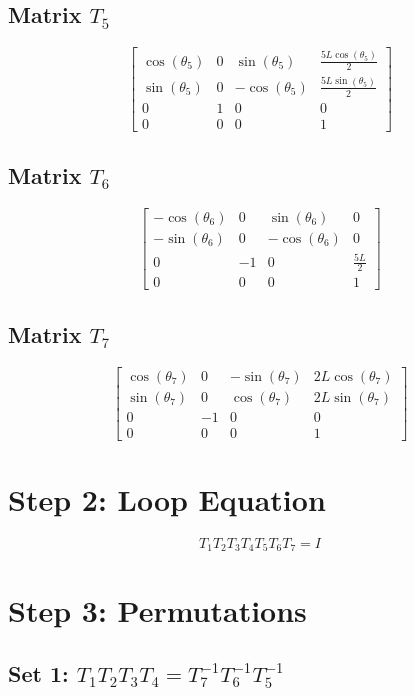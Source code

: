 \documentclass[12pt, a4paper]{article}
\begin{document}
\subsection*{Matrix $T_{5}$}
\[ \left[\begin{matrix}\cos{\left(\theta_{5} \right)} & 0 & \sin{\left(\theta_{5} \right)} & \frac{5 L \cos{\left(\theta_{5} \right)}}{2}\\\sin{\left(\theta_{5} \right)} & 0 & - \cos{\left(\theta_{5} \right)} & \frac{5 L \sin{\left(\theta_{5} \right)}}{2}\\0 & 1 & 0 & 0\\0 & 0 & 0 & 1\end{matrix}\right] \]
\subsection*{Matrix $T_{6}$}
\[ \left[\begin{matrix}- \cos{\left(\theta_{6} \right)} & 0 & \sin{\left(\theta_{6} \right)} & 0\\- \sin{\left(\theta_{6} \right)} & 0 & - \cos{\left(\theta_{6} \right)} & 0\\0 & -1 & 0 & \frac{5 L}{2}\\0 & 0 & 0 & 1\end{matrix}\right] \]
\subsection*{Matrix $T_{7}$}
\[ \left[\begin{matrix}\cos{\left(\theta_{7} \right)} & 0 & - \sin{\left(\theta_{7} \right)} & 2 L \cos{\left(\theta_{7} \right)}\\\sin{\left(\theta_{7} \right)} & 0 & \cos{\left(\theta_{7} \right)} & 2 L \sin{\left(\theta_{7} \right)}\\0 & -1 & 0 & 0\\0 & 0 & 0 & 1\end{matrix}\right] \]


\section{Step 2: Loop Equation}
\[ T_1 T_2 T_3 T_4 T_5 T_6 T_7 = I \]

\section{Step 3: Permutations}
\subsection*{Set 1: $T_{1}T_{2}T_{3}T_{4} = T_{7}^{-1}T_{6}^{-1}T_{5}^{-1}$}
\end{document}
